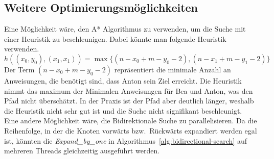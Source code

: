 \documentclass[a4paper,10pt,ngerman]{scrartcl}
\begin{document}
    \subsection{Weitere Optimierungsmöglichkeiten}
    Eine Möglichkeit wäre, den A* Algorithmus zu verwenden, um die Suche mit einer Heuristik zu beschleunigen.
    Dabei könnte man folgende Heuristik verwenden.
    \[h((x_0, y_0), (x_1, x_1)) = \max\{(n - x_0 + m - y_0 - 2), (n - x_1 + m - y_1 - 2)\}\]
    Der Term $(n - x_0 + m - y_0 - 2)$ repräsentiert die minimale Anzahl an Anweisungen, die benötigt sind, dass Anton sein Ziel erreicht.
    Die Heuristik nimmt das maximum der Minimalen Anweisungen für Bea und Anton, was den Pfad nicht überschätzt.
    In der Praxis ist der Pfad aber deutlich länger, weshalb die Heuristik nicht sehr gut ist und die Suche nicht signifikant beschleunigt.\\

    Eine andere Möglichkeit wäre, die Bidirektionale Suche zu parallelisieren.
    Da die Reihenfolge, in der die Knoten vorwärts bzw.\ Rückwärts expandiert werden egal ist, könnten die \textit{Expand\_by\_one} in Algorithmus~\ref{alg:bidirectional-search} auf mehreren Threads gleichzeitig ausgeführt werden.
\end{document}
